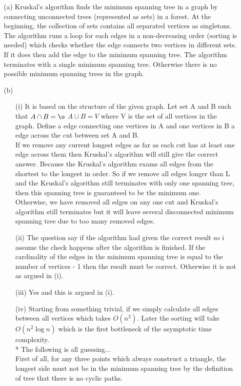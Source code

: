 \documentclass[10pt,twoside,a4paper]{article}
\begin{document}
\begin{itemize}
\item[(a)]
Kruskal's algorithm finds the minimum spanning tree in a graph by connecting unconnected trees (represented as sets) in a forest. At the beginning, the collection of sets contains all separated vertices as singletons. The algorithm runs a loop for each edges in a non-decreasing order (sorting is needed) which checks whether the edge connects two vertices in different sets. If it does then add the edge to the minimum spanning tree. The algorithm terminates with a single minimum spanning tree. Otherwise there is no possible minimum spanning trees in the graph.
\item[(b)]
\begin{itemize}
\item[(i)]
It is based on the structure of the given graph. Let set A and B such that $A \cap B = \o $ $A \cup B = V$ where V is the set of all vertices in the graph. Define a edge connecting one vertices in A and one vertices in B a edge across the cut between set A and B. 
\\If we remove any current longest edges as far as each cut has at least one edge across them then Kruskal's algorithm will still give the correct answer. Because the Kruskal's algorithm exams all edges from the shortest to the longest in order. So if we remove all edges longer than L and the Kruskal's algorithm still terminates with only one spanning tree, then this spanning tree is guaranteed to be the minimum one. 
\\Otherwise, we have removed all edges on any one cut and Kruskal's algorithm still terminates but it will leave several disconnected minimum spanning tree due to too many removed edges.
\item[(ii)]
The question say if the algorithm had given the correct result so i assume the check happens after the algorithm is finished. If the cardinality of the edges in the minimum spanning tree is equal to the number of vertices - 1 then the result must be correct. Otherwise it is not as argued in (i).
\item[(iii)]
Yes and this is argued in (i).
\item[(iv)]
Starting from something trivial, if we simply calculate all edges between all vertices which takes $O(n^2)$. Later the sorting will take $O(n^2\log n)$ which is the first bottleneck of the asymptotic time complexity.
\\* The following is all guessing...
\\First of all, for any three points which always construct a triangle, the longest side must not be in the minimum spanning tree by the definition of tree that there is no cyclic paths.

\end{itemize}
\end{itemize}
\end{document}
